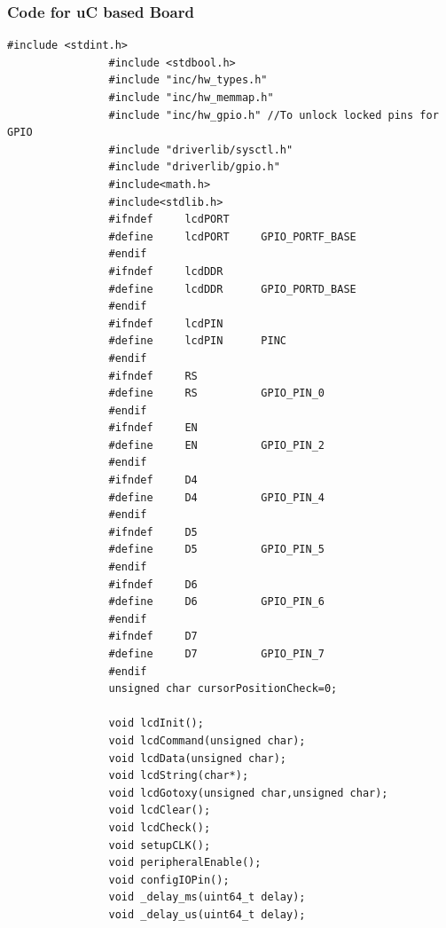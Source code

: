 \documentclass[a4paper,10pt,oneside]{article}
\begin{document}
			\subsubsection{\textbf{Code for uC based Board}}
			\begin{lstlisting}[style=CStyle]
				#include <stdint.h>
				#include <stdbool.h>
				#include "inc/hw_types.h"
				#include "inc/hw_memmap.h"
				#include "inc/hw_gpio.h" //To unlock locked pins for GPIO
				#include "driverlib/sysctl.h"
				#include "driverlib/gpio.h"
				#include<math.h>
				#include<stdlib.h>
				#ifndef     lcdPORT
				#define     lcdPORT     GPIO_PORTF_BASE
				#endif
				#ifndef     lcdDDR
				#define     lcdDDR      GPIO_PORTD_BASE
				#endif
				#ifndef     lcdPIN
				#define     lcdPIN      PINC
				#endif
				#ifndef     RS
				#define     RS          GPIO_PIN_0
				#endif
				#ifndef     EN
				#define     EN          GPIO_PIN_2
				#endif
				#ifndef     D4
				#define     D4          GPIO_PIN_4
				#endif
				#ifndef     D5
				#define     D5          GPIO_PIN_5
				#endif
				#ifndef     D6
				#define     D6          GPIO_PIN_6
				#endif
				#ifndef     D7
				#define     D7          GPIO_PIN_7
				#endif
				unsigned char cursorPositionCheck=0;
				
				void lcdInit();
				void lcdCommand(unsigned char);
				void lcdData(unsigned char);
				void lcdString(char*);
				void lcdGotoxy(unsigned char,unsigned char);
				void lcdClear();
				void lcdCheck();
				void setupCLK();
				void peripheralEnable();
				void configIOPin();
				void _delay_ms(uint64_t delay);
				void _delay_us(uint64_t delay);
				

\end{lstlisting}
\end{document}
